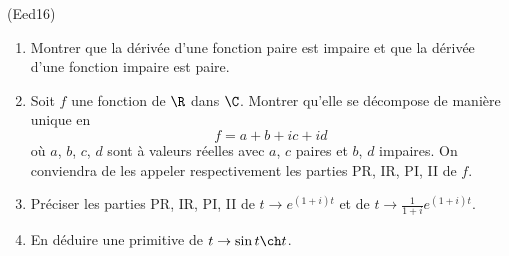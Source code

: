 \begin{tiny}(Eed16)\end{tiny}
\begin{enumerate}
  \item Montrer que la dérivée d'une fonction paire est impaire et que la dérivée d'une fonction impaire est paire.
  \item Soit $f$ une fonction de $\R$ dans $\C$. Montrer qu'elle se décompose de manière unique en
\[
  f = a + b + ic + id
\]
où $a$, $b$, $c$, $d$ sont à valeurs réelles avec $a$, $c$ paires et $b$, $d$ impaires. On conviendra de les appeler respectivement les parties PR, IR, PI, II de $f$.
 \item Préciser les parties PR, IR, PI, II de $t\rightarrow e^{(1+i)t}$ et de $t \rightarrow \frac{1}{1+i}e^{(1+i)t}$.
 \item En déduire une primitive de $t \rightarrow \sin t \ch t$.
\end{enumerate}

